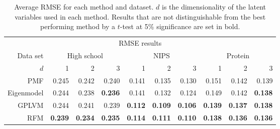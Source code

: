 
\begin{table}
\begin{center}
  \begin{tabular}{r | r r r | r r r | r r r}
    \multicolumn{10}{c}{RMSE results} \\
    \addlinespace[2pt]
    Data set & \multicolumn{3}{c|}{High school} & \multicolumn{3}{c|}{NIPS} & \multicolumn{3}{c}{Protein} \\
    $d$ & 1 & 2 & 3 & 1 & 2 & 3 & 1 & 2 & 3 \\
    \midrule
    PMF                   & 0.245 & 0.242 & 0.240 & 0.141 & 0.135 & 0.130 & 0.151 & 0.142 & 0.139 \\
    Eigenmodel            & 0.244 & 0.238 & \textbf{0.236} & 0.141 & 0.132 & 0.124 & 0.149 & 0.142 & \textbf{0.138} \\
    GPLVM                 &0.244 & 0.241 & 0.239 & \textbf{0.112} & \textbf{0.109} & \textbf{0.106} & \textbf{0.139} & \textbf{0.137} & \textbf{0.138} \\
    RFM & \textbf{0.239} & \textbf{0.234} & \textbf{0.235} & \textbf{0.114} & \textbf{0.111} & \textbf{0.110} & \textbf{0.138} & \textbf{0.136} & \textbf{0.136}
  \end{tabular}
\end{center}
  \caption[RMSEs in link prediction experiment.]{Average RMSE for each method and dataset. $d$ is the dimensionality of the latent variables used in each method. Results that are not distinguishable from the best performing method by a $t$-test at 5\% significance are set in bold.}
  \label{table:networks:RMSEs}
\end{table}

